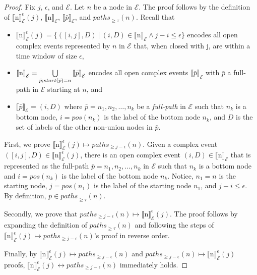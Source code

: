 \begin{proof}
  Fix $j$, $\epsilon$, and $\mathcal{E}$. Let $n$ be a node in $\mathcal{E}$. The proof follows by the definition of ${\llbracket \text{n} \rrbracket}^{\epsilon}_{\mathcal{E}}(j)$, ${\llbracket \text{n} \rrbracket}_{\mathcal{E}}$, ${\llbracket \bar{p} \rrbracket}_{\mathcal{E}}$, and ${paths}_{\ge \tau}(n)$. Recall that

  \begin{itemize}
    \item ${\llbracket \text{n} \rrbracket}^{\epsilon}_{\mathcal{E}}(j) = \{ ([i,j], D) \ | \ (i,D) \in {\llbracket \text{n} \rrbracket}_{\mathcal{E}} \land j - i \le \epsilon \}$ encodes all open complex events represented by $n$ in $\mathcal{E}$ that, when closed with j, are within a time window of size $\epsilon$,
    \item ${\llbracket \text{n} \rrbracket}_{\mathcal{E}} = \bigcup\limits_{\bar{p};\\ start(\bar{p}) = n} {\llbracket \bar{p} \rrbracket}_{\mathcal{E}}$ encodes all open complex events ${\llbracket \bar{p} \rrbracket}_{\mathcal{E}}$ with $\bar{p}$ a full-path in $\mathcal{E}$ starting at $n$, and
    \item ${\llbracket \bar{p} \rrbracket}_{\mathcal{E}} = (i, D)$ where $\bar{p} = n_{1},n_{2}, \ldots, n_{k}$ be a \emph{full-path} in $\mathcal{E}$ such that $n_{k}$ is a bottom node, $i = pos(n_{k})$ is the label of the bottom node $n_{k}$, and $D$ is the set of labels of the other non-union nodes in $\bar{p}$.
  \end{itemize}

  First, we prove ${\llbracket \text{n} \rrbracket}^{\epsilon}_{\mathcal{E}}(j) \longmapsto paths_{\ge j - \epsilon}(n)$. Given a complex event $([i, j], D) \in {\llbracket \text{n} \rrbracket}^{\epsilon}_{\mathcal{E}}(j)$, there is an open complex event $(i, D) \in {\llbracket \text{n} \rrbracket}_{\mathcal{E}}$ that is represented as the full-path $\bar{p} = n_{1},n_{2}, \ldots, n_{k}$ in $\mathcal{E}$ such that $n_{k}$ is a bottom node and $i = pos(n_{k})$ is the label of the bottom node $n_{k}$. Notice, $n_{1} = n$ is the starting node, $j = pos(n_{1})$ is the label of the starting node $n_{1}$, and $j - i \le \epsilon$. By definition, $\bar{p} \in {paths}_{\ge \tau}(n)$.

  Secondly, we prove that $paths_{\ge j - \epsilon}(n) \longmapsto {\llbracket \text{n} \rrbracket}^{\epsilon}_{\mathcal{E}}(j)$. The proof follows by expanding the definition of ${paths}_{\ge \tau}(n)$ and following the steps of ${\llbracket \text{n} \rrbracket}^{\epsilon}_{\mathcal{E}}(j) \longmapsto paths_{\ge j - \epsilon}(n)$'s proof in reverse order.

  Finally, by ${\llbracket \text{n} \rrbracket}^{\epsilon}_{\mathcal{E}}(j) \longmapsto paths_{\ge j - \epsilon}(n)$ and $paths_{\ge j - \epsilon}(n) \longmapsto {\llbracket \text{n} \rrbracket}^{\epsilon}_{\mathcal{E}}(j)$ proofs, ${\llbracket \text{n} \rrbracket}^{\epsilon}_{\mathcal{E}}(j) \longleftrightarrow paths_{\ge j - \epsilon}(n)$ immediately holds.

\end{proof}

